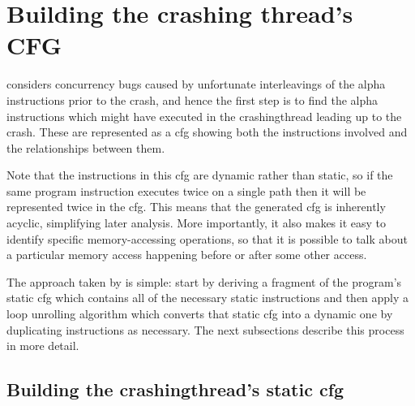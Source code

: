 \section{Building the crashing thread's CFG}
\label{sect:derive:build_crashing_cfg}

{\Technique} considers concurrency bugs caused by unfortunate
interleavings of the \gls{alpha} instructions prior to the crash, and
hence the first step is to find the \gls{alpha} instructions which
might have executed in the \gls{crashingthread} leading up to the
crash.  These are represented as a \gls{cfg} showing both the
instructions involved and the relationships between them.

Note that the instructions in this \gls{cfg} are dynamic rather than
static, so if the same program instruction executes twice on a single
path then it will be represented twice in the \gls{cfg}.  This means
that the generated \gls{cfg} is inherently acyclic, simplifying later
analysis.  More importantly, it also makes it easy to identify
specific memory-accessing operations, so that it is possible to talk
about a particular memory access happening before or after some other
access.

The approach taken by {\technique} is simple: start by deriving a
fragment of the program's static \gls{cfg} which contains all of the
necessary static instructions and then apply a loop unrolling
algorithm which converts that static \gls{cfg} into a dynamic one by
duplicating instructions as necessary.  The next subsections describe
this process in more detail.

\subsection[Building the \glsentrytext{crashingthread}'s static \glsentrytext{cfg}]{Building the \gls{crashingthread}'s static \gls{cfg}}
\label{sect:derive:build_static_cfg}

